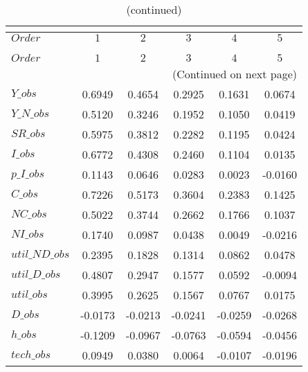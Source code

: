  
\begin{center}
\begin{longtable}{lccccc} 
\caption{COEFFICIENTS OF AUTOCORRELATION}\\
 \label{Table:th_autocorr_matrix}\\
\toprule 
$Order          $	 & 	 $          1$	 & 	 $          2$	 & 	 $          3$	 & 	 $          4$	 & 	 $          5$\\
\midrule \endfirsthead 
\caption{(continued)}\\
 \toprule \\ 
$Order          $	 & 	 $          1$	 & 	 $          2$	 & 	 $          3$	 & 	 $          4$	 & 	 $          5$\\
\midrule \endhead 
\midrule \multicolumn{6}{r}{(Continued on next page)} \\ \bottomrule \endfoot 
\bottomrule \endlastfoot 
$Y\_obs         $	 & 	     0.6949	 & 	     0.4654	 & 	     0.2925	 & 	     0.1631	 & 	     0.0674 \\ 
$Y\_N\_obs      $	 & 	     0.5120	 & 	     0.3246	 & 	     0.1952	 & 	     0.1050	 & 	     0.0419 \\ 
$SR\_obs        $	 & 	     0.5975	 & 	     0.3812	 & 	     0.2282	 & 	     0.1195	 & 	     0.0424 \\ 
$I\_obs         $	 & 	     0.6772	 & 	     0.4308	 & 	     0.2460	 & 	     0.1104	 & 	     0.0135 \\ 
$p\_I\_obs      $	 & 	     0.1143	 & 	     0.0646	 & 	     0.0283	 & 	     0.0023	 & 	    -0.0160 \\ 
$C\_obs         $	 & 	     0.7226	 & 	     0.5173	 & 	     0.3604	 & 	     0.2383	 & 	     0.1425 \\ 
$NC\_obs        $	 & 	     0.5022	 & 	     0.3744	 & 	     0.2662	 & 	     0.1766	 & 	     0.1037 \\ 
$NI\_obs        $	 & 	     0.1740	 & 	     0.0987	 & 	     0.0438	 & 	     0.0049	 & 	    -0.0216 \\ 
$util\_ND\_obs  $	 & 	     0.2395	 & 	     0.1828	 & 	     0.1314	 & 	     0.0862	 & 	     0.0478 \\ 
$util\_D\_obs   $	 & 	     0.4807	 & 	     0.2947	 & 	     0.1577	 & 	     0.0592	 & 	    -0.0094 \\ 
$util\_obs      $	 & 	     0.3995	 & 	     0.2625	 & 	     0.1567	 & 	     0.0767	 & 	     0.0175 \\ 
$D\_obs         $	 & 	    -0.0173	 & 	    -0.0213	 & 	    -0.0241	 & 	    -0.0259	 & 	    -0.0268 \\ 
$h\_obs         $	 & 	    -0.1209	 & 	    -0.0967	 & 	    -0.0763	 & 	    -0.0594	 & 	    -0.0456 \\ 
$tech\_obs      $	 & 	     0.0949	 & 	     0.0380	 & 	     0.0064	 & 	    -0.0107	 & 	    -0.0196 \\ 
\end{longtable}
 \end{center}
